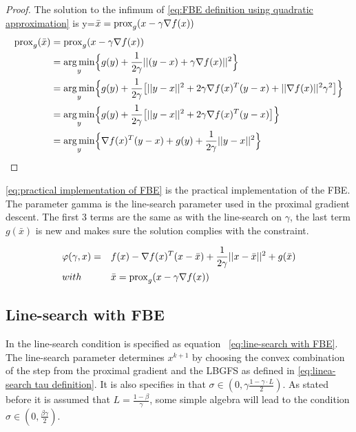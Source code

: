 		\begin{proof}
			The solution to the infimum of \eqref{eq:FBE definition using quadratic approximation} is y=$\bar{x}= \operatorname{prox}_g(x-\gamma \nabla f(x))$
			\begin{align*}
			\operatorname{prox}_g(\bar{x}) 
			&=\operatorname{prox}_g(x- \gamma \nabla f(x)) \\
			&= \underset{y}{\operatorname*{arg\,min}} \Big \{ g(y) 
			+ \frac{1}{2 \gamma}||(y-x) + \gamma \nabla f(x)||^2 \Big \} \\
			&= \underset{y}{\operatorname*{arg\,min}} \Big \{ g(y) 
			+ \frac{1}{2 \gamma} \big[||y-x||^2 + 2 \gamma \nabla f(x)^T(y-x) + ||\nabla f(x)||^2\gamma^2 \big] \Big \} \\
			&= \underset{y}{\operatorname*{arg\,min}} \Big \{ g(y) 
			+ \frac{1}{2 \gamma} \big[||y-x||^2 + 2 \gamma \nabla f(x)^T(y-x)  \big] \Big \}\\
			&= \underset{y}{\operatorname*{arg\,min}} \Big \{   \nabla f(x)^T(y-x)  + g(y) 
			+ \frac{1}{2 \gamma} ||y-x||^2  \Big  \}
			\end{align*}
			\label{prf:prox is solution to FBE inf}
		\end{proof}
		
		\eqref{eq:practical implementation of FBE} is the practical implementation of the FBE. The parameter gamma is the line-search parameter used in the proximal gradient descent. The first 3 terms are the same as with the line-search on $\gamma$, the last term $g(\bar{x})$ is new and makes sure the solution complies with the constraint.
		
%		
		\begin{equation}
			\begin{aligned}	
				& \varphi(\gamma,x)= 
				&& f(x) - \nabla f(x)^T(x-\bar{x}) + \frac{1}{2 \gamma}||x-\bar{x}||^2  + g(\bar{x})
				\\
				& with 
				&&\bar{x} = \operatorname{prox}_g( x - \gamma\nabla f(x)) 
			\end{aligned} 
			\label{eq:practical implementation of FBE}
		\end{equation}
		
	
	\subsection{Line-search with FBE}
	In \cite{LorenzoStella2017} the line-search condition is specified as equation ~\eqref{eq:line-search with FBE}. The line-search parameter determines $x^{k+1}$ by choosing the convex combination of the step from the proximal gradient and the LBGFS as defined in \eqref{eq:linea-search tau definition}. It is also specifies in \cite{LorenzoStella2017} that $\sigma \in (0, \gamma \frac{1-\gamma\cdot L}{2})$. As stated before it is assumed that $L=\frac{1-\beta}{\gamma}$, some simple algebra will lead to the condition $\sigma \in (0,\frac{\beta \gamma}{2})$.
	
